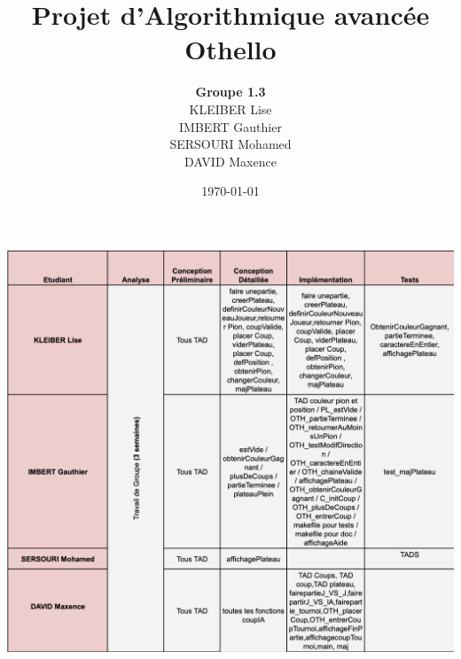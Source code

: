 \documentclass[a4paper,12pt]{article}
\title{Projet d'Algorithmique avancée\\ \huge Othello}
\author{\textbf{Groupe 1.3}\\KLEIBER Lise\\IMBERT Gauthier\\SERSOURI Mohamed\\DAVID Maxence}
\date{\today}
\begin{document}
\maketitle
\newpage
\tableofcontents
\newpage

\newpage

\newpage

\newpage

\newpage

\newpage
\includegraphics[scale=0.75]{travail.png}
\newpage

\newpage




%

%

%
\newpage


%
\end{document}
